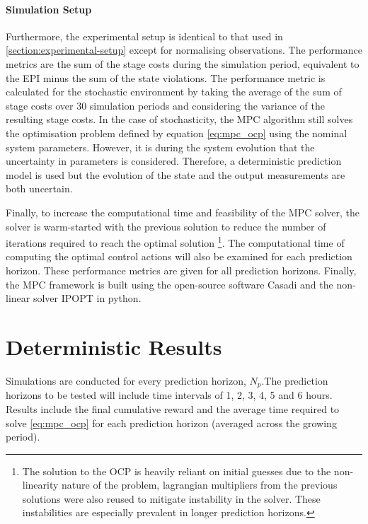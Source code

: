 \paragraph{Simulation Setup}
Furthermore, the experimental setup is identical to that used in \autoref{section:experimental-setup} except for normalising observations. The performance metrics are the sum of the stage costs during the simulation period, equivalent to the EPI minus the sum of the state violations. The performance metric is calculated for the stochastic environment by taking the average of the sum of stage costs over 30 simulation periods and considering the variance of the resulting stage costs. In the case of stochasticity, the MPC algorithm still solves the optimisation problem defined by equation \autoref{eq:mpc_ocp} using the nominal system parameters. However, it is during the system evolution that the uncertainty in parameters is considered. Therefore, a deterministic prediction model is used but the evolution of the state and the output measurements are both uncertain.

Finally, to increase the computational time and feasibility of the MPC solver, the solver is warm-started with the previous solution to reduce the number of iterations required to reach the optimal solution \footnote{The solution to the OCP is heavily reliant on initial guesses due to the non-linearity nature of the problem, lagrangian multipliers from the previous solutions were also reused to mitigate instability in the solver. These instabilities are especially prevalent in longer prediction horizons.}. The computational time of computing the optimal control actions will also be examined for each prediction horizon. These performance metrics are given for all prediction horizons. Finally, the MPC framework is built using the open-source software Casadi \cite{Andersson2018} and the non-linear solver IPOPT \cite{wachterImplementationInteriorpointFilter2006} in python. 

\section{Deterministic Results}
Simulations are conducted for every prediction horizon, $N_p$.The prediction horizons to be tested will include time intervals of 1, 2, 3, 4, 5 and 6 hours. Results include the final cumulative reward and the average time required to solve \autoref{eq:mpc_ocp} for each prediction horizon (averaged across the growing period).

